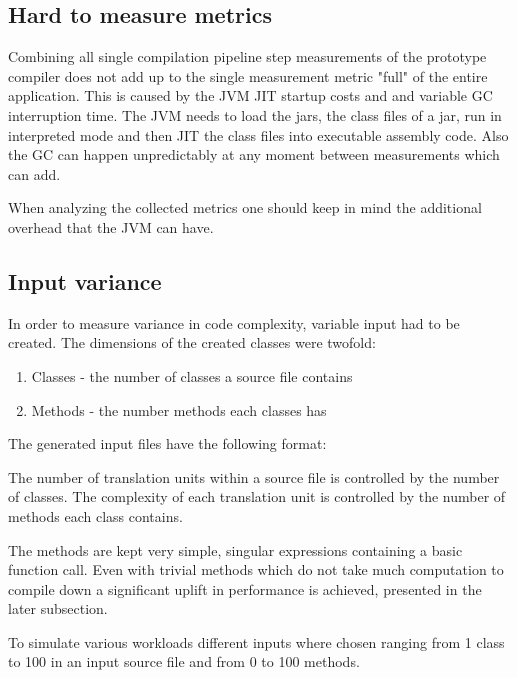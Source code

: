 \documentclass{VUMIFPSbakalaurinis}
\begin{document}
\subsection{Hard to measure metrics}
Combining all single compilation pipeline step measurements of the prototype compiler does not add up to the single measurement metric "full" of the entire application.
This is caused by the JVM JIT startup costs and and variable GC interruption time.
The JVM needs to load the jars, the class files of a jar, run in interpreted mode and then JIT the class files into executable assembly code.
Also the GC can happen unpredictably at any moment between measurements which can add.

When analyzing the collected metrics one should keep in mind the additional overhead that the JVM can have.

\subsection{Input variance}
In order to measure variance in code complexity, variable input had to be created.
The dimensions of the created classes were twofold:

\begin{enumerate}
\item{Classes - the number of classes a source file contains}
\item{Methods - the number methods each classes has}
\end{enumerate}

The generated input files have the following format:



The number of translation units within a source file is controlled by the number of classes.
The complexity of each translation unit is controlled by the number of methods each class contains.

The methods are kept very simple, singular expressions containing a basic function call.
Even with trivial methods which do not take much computation to compile down a significant uplift in performance is achieved, presented in the later subsection.

To simulate various workloads different inputs where chosen ranging from 1 class to 100 in an input source file and from 0 to 100 methods.
\end{document}
